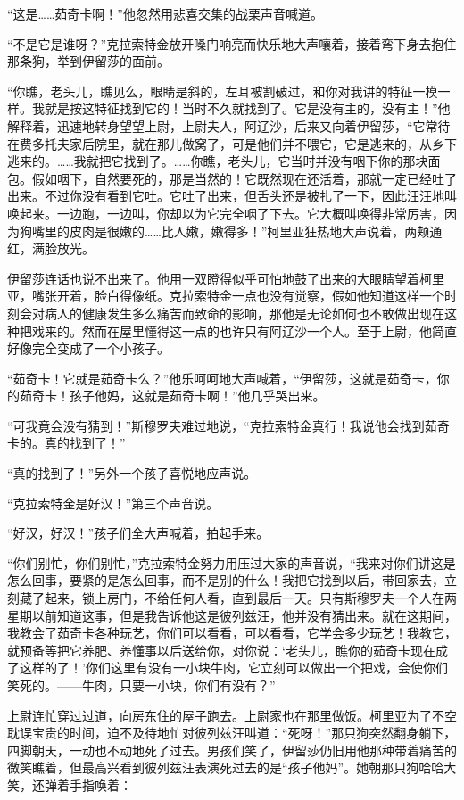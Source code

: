 \par “这是……茹奇卡啊！”他忽然用悲喜交集的战栗声音喊道。
\par “不是它是谁呀？”克拉索特金放开嗓门响亮而快乐地大声嚷着，接着弯下身去抱住那条狗，举到伊留莎的面前。
\par “你瞧，老头儿，瞧见么，眼睛是斜的，左耳被割破过，和你对我讲的特征一模一样。我就是按这特征找到它的！当时不久就找到了。它是没有主的，没有主！”他解释着，迅速地转身望望上尉，上尉夫人，阿辽沙，后来又向着伊留莎，“它常待在费多托夫家后院里，就在那儿做窝了，可是他们并不喂它，它是逃来的，从乡下逃来的。……我就把它找到了。……你瞧，老头儿，它当时并没有咽下你的那块面包。假如咽下，自然要死的，那是当然的！它既然现在还活着，那就一定已经吐了出来。不过你没有看到它吐。它吐了出来，但舌头还是被扎了一下，因此汪汪地叫唤起来。一边跑，一边叫，你却以为它完全咽了下去。它大概叫唤得非常厉害，因为狗嘴里的皮肉是很嫩的……比人嫩，嫩得多！”柯里亚狂热地大声说着，两颊通红，满脸放光。
\par 伊留莎连话也说不出来了。他用一双瞪得似乎可怕地鼓了出来的大眼睛望着柯里亚，嘴张开着，脸白得像纸。克拉索特金一点也没有觉察，假如他知道这样一个时刻会对病人的健康发生多么痛苦而致命的影响，那他是无论如何也不敢做出现在这种把戏来的。然而在屋里懂得这一点的也许只有阿辽沙一个人。至于上尉，他简直好像完全变成了一个小孩子。
\par “茹奇卡！它就是茹奇卡么？”他乐呵呵地大声喊着，“伊留莎，这就是茹奇卡，你的茹奇卡！孩子他妈，这就是茹奇卡啊！”他几乎哭出来。
\par “可我竟会没有猜到！”斯穆罗夫难过地说，“克拉索特金真行！我说他会找到茹奇卡的。真的找到了！”
\par “真的找到了！”另外一个孩子喜悦地应声说。
\par “克拉索特金是好汉！”第三个声音说。
\par “好汉，好汉！”孩子们全大声喊着，拍起手来。
\par “你们别忙，你们别忙，”克拉索特金努力用压过大家的声音说，“我来对你们讲这是怎么回事，要紧的是怎么回事，而不是别的什么！我把它找到以后，带回家去，立刻藏了起来，锁上房门，不给任何人看，直到最后一天。只有斯穆罗夫一个人在两星期以前知道这事，但是我告诉他这是彼列兹汪，他并没有猜出来。就在这期间，我教会了茹奇卡各种玩艺，你们可以看看，可以看看，它学会多少玩艺！我教它，就预备等把它养肥、养懂事以后送给你，对你说：‘老头儿，瞧你的茹奇卡现在成了这样的了！’你们这里有没有一小块牛肉，它立刻可以做出一个把戏，会使你们笑死的。——牛肉，只要一小块，你们有没有？”
\par 上尉连忙穿过过道，向房东住的屋子跑去。上尉家也在那里做饭。柯里亚为了不空耽误宝贵的时间，迫不及待地忙对彼列兹汪叫道：“死呀！”那只狗突然翻身躺下，四脚朝天，一动也不动地死了过去。男孩们笑了，伊留莎仍旧用他那种带着痛苦的微笑瞧着，但最高兴看到彼列兹汪表演死过去的是“孩子他妈”。她朝那只狗哈哈大笑，还弹着手指唤着：
